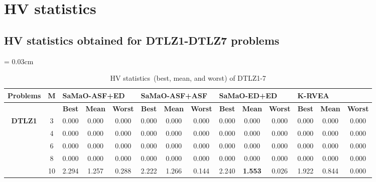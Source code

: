 \documentclass[onecolumn,10pt]{asme2ej}
\begin{document}
\clearpage

\section{HV statistics}
 
\subsection{HV statistics obtained for DTLZ1-DTLZ7 problems}
\begin{table}[!htb]\scriptsize
	\centering
	\caption{HV statistics~(best, mean, and worst) of DTLZ1-7}
	\label{tab:KHTTab:1}
	\tabcolsep = 0.03cm
	\begin{tabular}{|c|c|c|c|c|c|c|c|c|c|c|c|c|c|}
	\hline
	\textbf{Problems}               & \textbf{M} & \multicolumn{3}{l|}{\textbf{SaMaO-ASF+ED}}      & \multicolumn{3}{l|}{\textbf{SaMaO-ASF+ASF}}     & \multicolumn{3}{l|}{\textbf{SaMaO-ED+ED}}       & \multicolumn{3}{l|}{\textbf{K-RVEA}}            \\ \hline
	\textbf{}                       & \textbf{}  & \textbf{Best} & \textbf{Mean}  & \textbf{Worst} & \textbf{Best} & \textbf{Mean}  & \textbf{Worst} & \textbf{Best} & \textbf{Mean}  & \textbf{Worst} & \textbf{Best} & \textbf{Mean}  & \textbf{Worst} \\ \hline
	\multirow{5}{*}{\textbf{DTLZ1}} & 3          & 0.000         & 0.000          & 0.000          & 0.000         & 0.000          & 0.000          & 0.000         & 0.000          & 0.000          & 0.000         & 0.000          & 0.000          \\ \cline{2-14} 
	& 4          & 0.000         & 0.000          & 0.000          & 0.000         & 0.000          & 0.000          & 0.000         & 0.000          & 0.000          & 0.000         & 0.000          & 0.000          \\ \cline{2-14} 
	& 6          & 0.000         & 0.000          & 0.000          & 0.000         & 0.000          & 0.000          & 0.000         & 0.000          & 0.000          & 0.000         & 0.000          & 0.000          \\ \cline{2-14} 
	& 8          & 0.000         & 0.000          & 0.000          & 0.000         & 0.000          & 0.000          & 0.000         & 0.000          & 0.000          & 0.000         & 0.000          & 0.000          \\ \cline{2-14} 
	& 10         & 2.294         & 1.257          & 0.288          & 2.222         & 1.266          & 0.144          & 2.240         & \textbf{1.553} & 0.026          & 1.922         & 0.844          & 0.000          \\ \hline

\end{tabular}
\end{table}
\end{document}
